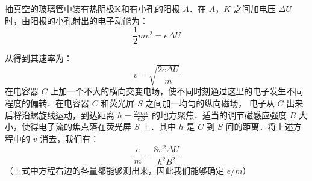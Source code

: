 抽真空的玻璃管中装有热阴极K和有小孔的阳极 $A$．在 $A$，$K$ 之间加电压 $\Delta U$ 时，由阳极的小孔射出的电子动能为：
\begin{equation}
\frac{1}{2}mv^2=e\Delta U
\end{equation}

从得到其速率为：
\begin{equation}
v=\sqrt{\frac{2e\Delta U}{m}}
\end{equation}
在电容器 $C$ 上加一个不大的横向交变电场，使不同时刻通过这里的电子发生不同程度的偏转．在电容器 $C$ 和荧光屏 $S$ 之间加一均匀的纵向磁场， 电子从 $C$ 出来后将沿螺旋线运动，到达距离 $h=\frac{2\pi mv}{eB}$ 的地方聚焦．适当的调节磁感应强度 $B$ 大小，使得电子流的焦点落在荧光屏 $S$ 上．其中 $h$ 是 $C$ 到 $S$ 间的距离．将上述方程中的 $v$ 消去，我们有：
\begin{equation}
\frac {e}{m}=\frac{8\pi ^2 \Delta U}{h^2 B^2}
\end{equation}
（上式中方程右边的各量都能够测出来，因此我们能够确定 $e/m$）
